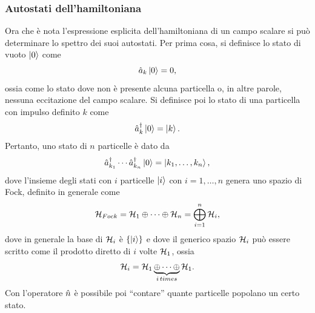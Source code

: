 \subsubsection{Autostati dell'hamiltoniana}
Ora che è nota l'espressione esplicita dell'hamiltoniana di un campo scalare si può determinare lo spettro dei suoi autostati. Per prima cosa, si definisce lo stato di vuoto $\ket{0}$ come
\begin{equation}
    \hat{a}_k\ket{0} = 0,
\end{equation}
ossia come lo stato dove non è presente alcuna particella o, in altre parole, nessuna eccitazione del campo scalare. Si definisce poi lo stato di una particella con impulso definito $k$ come
\begin{equation}
    \hat{a}^\dagger_k\ket{0} = \ket{k}.
\end{equation}
Pertanto, uno stato di $n$ particelle è dato da
\begin{equation}
    \hat{a}^\dagger_{k_1}\cdots\hat{a}^\dagger_{k_n}\ket{0} = \ket{k_1,\dots,k_n},
\end{equation}
dove l'insieme degli stati con $i$ particelle $\ket{i}$ con $i=1,\dots,n$ genera uno spazio di Fock, definito in generale come
\begin{equation}
    \mathcal{H}_{Fock} = \mathcal{H}_1 \oplus \cdots \oplus \mathcal{H}_n = \bigoplus_{i=1}^{n}\mathcal{H}_i,
\end{equation}
dove in generale la base di $\mathcal{H}_i$ è $\{\ket{i}\}$ e dove il generico spazio $\mathcal{H}_i$ può essere scritto come il prodotto diretto di $i$ volte $\mathcal{H}_1$, ossia
\begin{equation}
    \mathcal{H}_i = \mathcal{H}_1\underbrace{\oplus\cdots\oplus}_{i\,times}\mathcal{H}_1.
\end{equation}
Con l'operatore $\hat{n}$ è possibile poi ``contare'' quante particelle popolano un certo stato.

